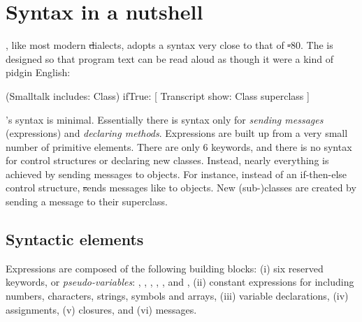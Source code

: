 \documentclass[a4paper,10pt,twoside]{book}
\begin{document}
	\renewcommand{\nnbb}[2]{} %
	\sloppy
\fi
\chapter{Syntax in a nutshell}
\label{cha:syntax}



\sq, like most modern \st dialects, adopts a syntax very close to that of \st-80.
The  is designed so that program text can be read aloud as though it were a kind of pidgin English:

\begin{code}{}
(Smalltalk includes: Class) ifTrue: [ Transcript show: Class superclass ]
\end{code}

\noindent
\sq's syntax is minimal.
Essentially there is syntax only for \emph{sending messages} (\ie expressions) and \emph{declaring methods}.
Expressions are built up from a very small number of  primitive elements.
There are only 6 keywords, and there is no syntax for control structures or declaring new classes.
Instead, nearly everything is achieved by sending messages to objects.
For instance, instead of an if-then-else control structure, \st sends messages like  to  objects.
New \mbox{(sub-)classes} are created by sending a message to their superclass.

\section{Syntactic elements}

Expressions are composed of the following building blocks:
(i) six reserved keywords, or \emph{pseudo-variables}:
, , , , , and ,
(ii) constant expressions for  including numbers, characters, strings, symbols and arrays,
(iii) variable declarations,
(iv) assignments,
(v)  closures, and
(vi) messages.
\end{document}
